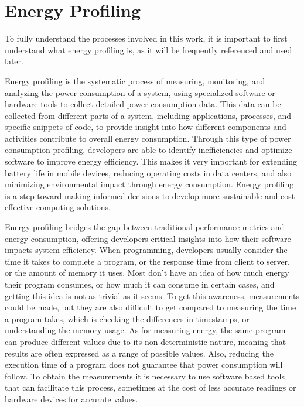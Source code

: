 \section{Energy Profiling} \label{sec:background_energy_profiling}

To fully understand the processes involved in this work, it is important to first understand what energy profiling is, as it will be frequently referenced and used later.

Energy profiling is the systematic process of measuring, monitoring, and analyzing the power consumption of a system, using specialized software or hardware tools to collect detailed power consumption data. This data can be collected from different parts of a system, including applications, processes, and specific snippets of code, to provide insight into how different components and activities contribute to overall energy consumption. Through this type of power consumption profiling, developers are able to identify inefficiencies and optimize software to improve energy efficiency. This makes it very important for extending battery life in mobile devices, reducing operating costs in data centers, and also minimizing environmental impact through energy consumption. Energy profiling is a step toward making informed decisions to develop more sustainable and cost-effective computing solutions.

Energy profiling bridges the gap between traditional performance metrics and energy consumption, offering developers critical insights into how their software impacts system efficiency.
When programming, developers usually consider the time it takes to complete a program, or the response time from client to server, or the amount of memory it uses. Most don't have an idea of how much energy their program consumes, or how much it can consume in certain cases, and getting this idea is not as trivial as it seems. To get this awareness, measurements could be made, but they are also difficult to get compared to measuring the time a program takes, which is checking the differences in timestamps, or understanding the memory usage. As for measuring energy, the same program can produce different values due to its non-deterministic nature, meaning that results are often expressed as a range of possible values. Also, reducing the execution time of a program does not guarantee that power consumption will follow\cite{10.1145/3136014.3136031}. To obtain the measurements it is necessary to use software based tools that can facilitate this process, sometimes at the cost of less accurate readings or hardware devices for accurate values.

